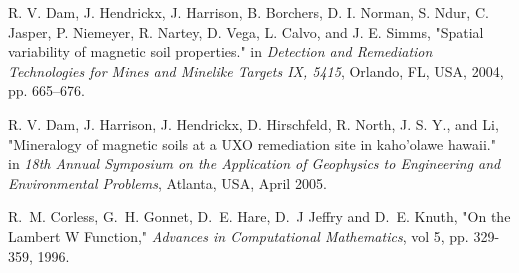 \documentclass[journal]{IEEEtran}  %
\begin{document}
\begin{thebibliography}{100}
R. V. Dam, J. Hendrickx, J. Harrison, B. Borchers, D. I. Norman, S. Ndur, C. Jasper, P. Niemeyer, R. Nartey, D. Vega, L. Calvo, and J. E. Simms, "Spatial variability of magnetic soil properties." in \emph{Detection and Remediation Technologies for Mines and Minelike Targets IX, 5415}, Orlando, FL, USA, 2004, pp. 665–676.

R. V. Dam, J. Harrison, J. Hendrickx, D. Hirschfeld, R. North, J. S. Y., and Li, "Mineralogy of magnetic soils at a UXO remediation site in kaho’olawe hawaii." in \emph{18th Annual Symposium on the Application of Geophysics to Engineering and Environmental Problems}, Atlanta, USA, April 2005. 


R.~M. Corless, G.~H. Gonnet, D.~E. Hare, D.~J Jeffry and D.~E. Knuth, "On the Lambert W Function," \emph{Advances in Computational Mathematics}, vol 5, pp. 329-359, 1996.










\end{thebibliography}











%
%
\end{document}
